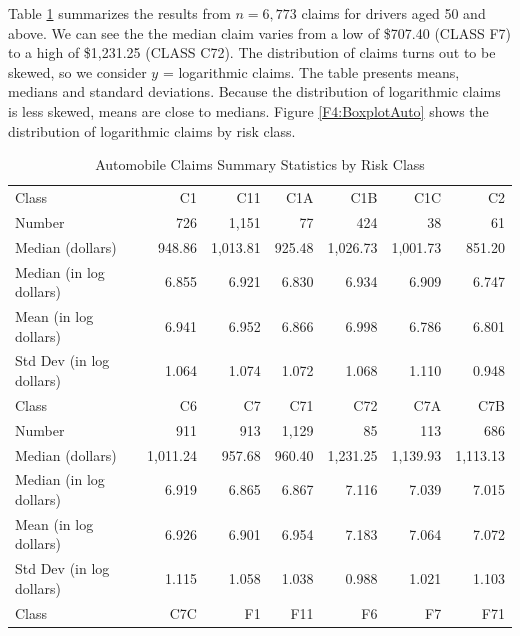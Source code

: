 Table \ref{T4:AutoSumStats} summarizes the results from $n=6,773$
claims for drivers aged 50 and above. We can see the the median
claim varies from a low of \$707.40 (CLASS F7) to a high of
\$1,231.25 (CLASS C72). The distribution of claims turns out to be
skewed, so we consider $y$ = logarithmic claims. The table presents
means, medians and standard deviations. Because the distribution of
logarithmic claims is less skewed, means are close to medians.
Figure \ref{F4:BoxplotAuto} shows the distribution of logarithmic
claims by risk class.



\begin{table}[h]
\caption{\label{T4:AutoSumStats} Automobile Claims Summary
Statistics by Risk Class}
\begin{tabular}{l|rrrrrr}
\hline
     Class &        C1  &        C11 &        C1A &        C1B &        C1C &        C2  \\
    Number &        726 &       1,151 &         77 &        424 &         38 &         61 \\
Median (dollars) &     948.86 &   1,013.81 &     925.48 &   1,026.73 &   1,001.73 &     851.20 \\
Median (in log dollars) &      6.855 &      6.921 &      6.830 &      6.934 &      6.909 &      6.747 \\
Mean (in log dollars) &      6.941 &      6.952 &      6.866 &      6.998 &      6.786 &      6.801 \\
Std Dev (in log dollars) &      1.064 &      1.074 &      1.072 &      1.068 &      1.110 &      0.948 \\
\hline
     Class &        C6  &        C7  &        C71 &        C72 &        C7A &        C7B \\
    Number &        911 &        913 &       1,129 &         85 &        113 &        686 \\
Median (dollars) &   1,011.24 &     957.68 &     960.40 &   1,231.25 &   1,139.93 &   1,113.13 \\
Median (in log dollars) &      6.919 &      6.865 &      6.867 &      7.116 &      7.039 &      7.015 \\
Mean (in log dollars) &      6.926 &      6.901 &      6.954 &      7.183 &      7.064 &      7.072 \\
Std Dev (in log dollars) &      1.115 &      1.058 &      1.038 &      0.988 &      1.021 &      1.103 \\
\hline
     Class &        C7C &        F1  &        F11 &        F6  &        F7  &        F71 \\

\end{tabular}
\end{table}
